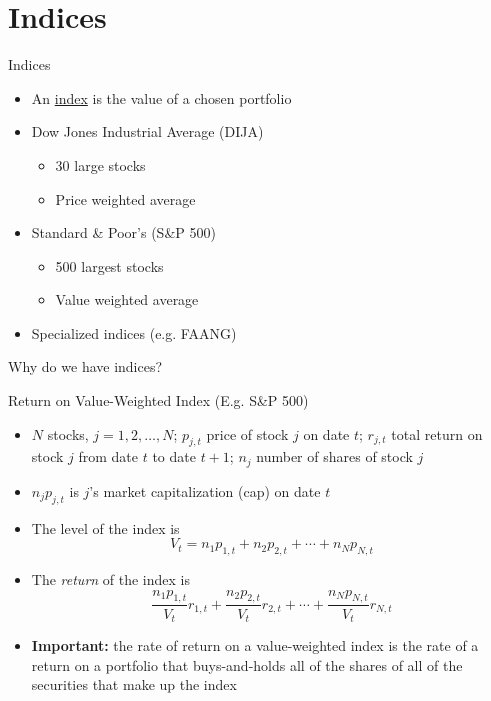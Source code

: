 \documentclass{beamer}
\begin{document}
\section{Indices}

\begin{frame}{Indices}
	\begin{itemize}
		\item An \underline{index} is the value of a chosen portfolio
		\item Dow Jones Industrial Average (DIJA)
		\begin{itemize}
			\item 30 large stocks
			\item Price weighted average
		\end{itemize}
		\item Standard \& Poor’s (S\&P 500)
		\begin{itemize}
			\item 500 largest stocks
			\item Value weighted average
		\end{itemize}
		\item Specialized indices (e.g. FAANG)
	\end{itemize}
	\begin{center}
		Why do we have indices? 
	\end{center}
\end{frame}

\begin{frame}{Return on Value-Weighted Index (E.g. S\&P 500)}
	\begin{itemize}
		\item $N$ stocks, $j=1,2,\ldots,N$; $p_{j,t}$ price of stock $j$ on date $t$; $r_{j,t}$ total return on stock $j$ from date $t$ to date $t+1$; $n_{j}$ number of shares of stock $j$
		\item $n_{j}p_{j,t}$ is $j$'s market capitalization (cap) on date $t$ 
		\item The level of the index is
			\begin{equation}
				V_{t}=n_{1}p_{1,t}+n_{2}p_{2,t}+\cdots+n_{N}p_{N,t}
			\end{equation}
		\item The \textit{return} of the index is
			\begin{equation}
				\frac{n_{1}p_{1,t}}{V_{t}}r_{1,t}+\frac{n_{2}p_{2,t}}{V_{t}}r_{2,t}+\cdots+\frac{n_{N}p_{N,t}}{V_{t}}r_{N,t}
			\end{equation}
		\item\textbf{Important:} the rate of return on a value-weighted index is the rate of a return on a portfolio that buys-and-holds all of the shares of all of the securities that make up the index
	\end{itemize}
\end{frame}
\end{document}
